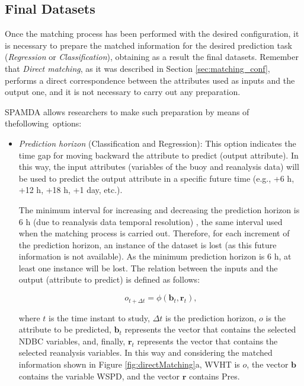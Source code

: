 \documentclass[energies,article,accept,moreauthors,pdftex]{Definitions/mdpi}
\begin{document}
\begin{paracol}{2}
\switchcolumn

			\vspace{-12pt}	
			\subsection{Final Datasets} \label{sec:FinalDatasets}

				Once the matching process has been performed with the desired configuration, it is necessary to prepare the matched information for the desired prediction task (\textit{Regression} or \textit{Classification}), obtaining as a result the final datasets. Remember that \textit{Direct matching}, as it was described in Section \ref{sec:matching_conf}, performs a direct correspondence between the attributes used as inputs and the output one, and it is not necessary to carry out any preparation.
				
				SPAMDA allows researchers to make such preparation by means of the\linebreak following~options:
				
					\begin{itemize}

						\item \textit{Prediction horizon} (Classification and Regression): This option indicates the time gap for moving backward the attribute to predict (output attribute). In this way, the input attributes (variables of the buoy and reanalysis data) will be used to predict the output attribute in a specific future time (e.g., +6 h, +12 h, +18 h, +1 day, etc.).
						
						The minimum interval for increasing and decreasing the prediction horizon is $6$ h (due to reanalysis data temporal resolution) \cite{DORADOMORENO2017428}, the same interval used when the matching process is carried out. Therefore, for each increment of the prediction horizon, an instance of the dataset is lost (as this future information is not available). As the minimum prediction horizon is $6$ h, at least one instance will be lost. The relation between the inputs and the output (attribute to predict) is defined as follows:
						\begin{linenomath*}
							\begin{equation}
								o_{t+\Delta t}=\phi(\mathbf{b}_t,\mathbf{r}_{t}),
								\label{eq:noSynchronisingRD}
							\end{equation}
						\end{linenomath*}
						where $t$ is the time instant to study, $\Delta t$ is the prediction horizon, $o$ is the attribute to be predicted, $\mathbf{b}_t$ represents the vector that contains the selected NDBC variables, and, finally, $\mathbf{r}_t$ represents the vector that contains the selected reanalysis variables. In this way and considering the matched information shown in Figure \ref{fig:directMatching}a, WVHT is $o$, the vector $\mathbf{b}$ contains the variable WSPD, and the vector $\mathbf{r}$ contains Pres.
						

\end{itemize}
\end{paracol}
\end{document}
